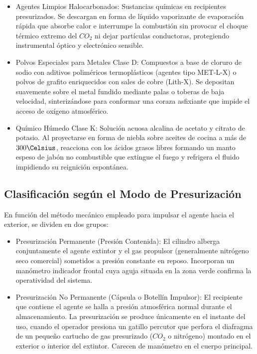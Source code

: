 \begin{itemize}
    \item Agentes Limpios Halocarbonados: Sustancias químicas en recipientes presurizados. Se descargan en forma de líquido vaporizante de
          evaporación rápida que absorbe calor e interrumpe la combustión sin provocar el choque térmico extremo del $CO_2$
          ni dejar partículas conductoras, protegiendo instrumental óptico y electrónico sensible.
    \item Polvos Especiales para Metales Clase D: Compuestos a base de cloruro de sodio con aditivos poliméricos
          termoplásticos (agentes tipo MET-L-X) o polvos de grafito enriquecidos con sales de cobre (Lith-X). Se depositan
          suavemente sobre el metal fundido mediante palas o toberas de baja velocidad, sinterizándose para conformar una
          coraza asfixiante que impide el acceso de oxígeno atmosférico.
    \item Químico Húmedo Clase K: Solución acuosa alcalina de acetato y citrato de potasio. Al proyectarse en forma de niebla
          sobre aceites de cocina a más de $300\Celsius$, reacciona con los ácidos grasos libres formando un manto espeso de
          jabón no combustible que extingue el fuego y refrigera el fluido impidiendo su reignición espontánea.
\end{itemize}

\subsection{Clasificación según el Modo de Presurización}

En función del método mecánico empleado para impulsar el agente hacia el exterior, se dividen en dos grupos:

\begin{itemize}
    \item Presurización Permanente (Presión Contenida): El cilindro alberga conjuntamente el agente extintor y el gas
          propulsor (generalmente nitrógeno seco comercial) sometidos a presión constante en reposo. Incorporan un
          manómetro indicador frontal cuya aguja situada en la zona verde confirma la operatividad del sistema.
    \item Presurización No Permanente (Cápsula o Botellín Impulsor): El recipiente que contiene el agente se halla a presión
          atmosférica normal durante el almacenamiento. La presurización se produce únicamente en el instante del uso,
          cuando el operador presiona un gatillo percutor que perfora el diafragma de un pequeño cartucho de gas presurizado
          ($CO_2$ o nitrógeno) montado en el exterior o interior del extintor. Carecen de manómetro en el cuerpo principal.
\end{itemize}

